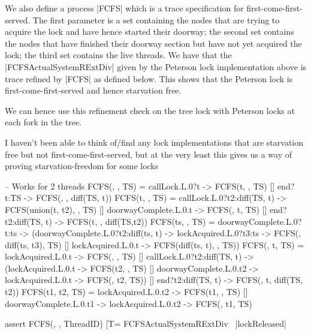 We also define a process |FCFS| which is a trace specification for first-come-first-served. The first parameter is a set containing the nodes that are trying to acquire the lock and have hence started their doorway; the second set contains the nodes that have finished their doorway section but have not yet acquired the lock; the third set contains the live threads. We have that the |FCFSActualSystemRExtDiv| given by the Peterson lock implementation above is trace refined by |FCFS| as defined below. This shows that the Peterson lock is first-come-first-served and hence starvation free. 

We can hence use this refinement check on the tree lock with Peterson locks at each fork in the tree.

I haven't been able to think of/find any lock implementations that are starvation free but not first-come-first-served, but at the very least this gives us a way of proving starvation-freedom for some locks

\begin{cspm}
  -- Works for 2 threads
  FCFS({}, {}, TS)     = callLock.L.0?t -> FCFS({t}, {}, TS)
                        [] end?t:TS -> FCFS({}, {}, diff(TS, {t}))
  FCFS({t}, {}, TS)    = callLock.L.0?t2:diff(TS, {t}) -> 
                              FCFS(union({t}, {t2}), {}, TS)
                        [] doorwayComplete.L.0.t -> FCFS({}, {t}, TS)
                        [] end?t2:diff(TS, {t}) -> FCFS({t}, {}, diff(TS,{t2}))
  FCFS(ts, {}, TS)     = doorwayComplete.L.0?t:ts -> 
                          (doorwayComplete.L.0?t2:diff(ts, {t}) -> 
                              lockAcquired.L.0?t3:ts -> 
                                FCFS({}, diff(ts, {t3}), TS)
                            [] lockAcquired.L.0.t -> FCFS(diff(ts, {t}), {}, TS))
  FCFS({}, {t}, TS)    = lockAcquired.L.0.t -> FCFS({}, {}, TS)
                        [] callLock.L.0?t2:diff(TS, {t}) -> 
                              (lockAcquired.L.0.t -> FCFS({t2}, {}, TS) 
                              [] doorwayComplete.L.0.t2 -> 
                                    lockAcquired.L.0.t -> FCFS({}, {t2}, TS))
                        [] end?t2:diff(TS, {t}) -> FCFS({}, {t}, diff(TS, {t2}))
  FCFS({t1}, {t2}, TS) = lockAcquired.L.0.t2 -> FCFS({t1}, {}, TS)
                        [] doorwayComplete.L.0.t1 -> lockAcquired.L.0.t2 
                                                  -> FCFS({}, {t1}, TS) 

  assert FCFS({}, {}, ThreadID) [T= FCFSActualSystemRExtDiv \ {|lockReleased|}
\end{cspm}

